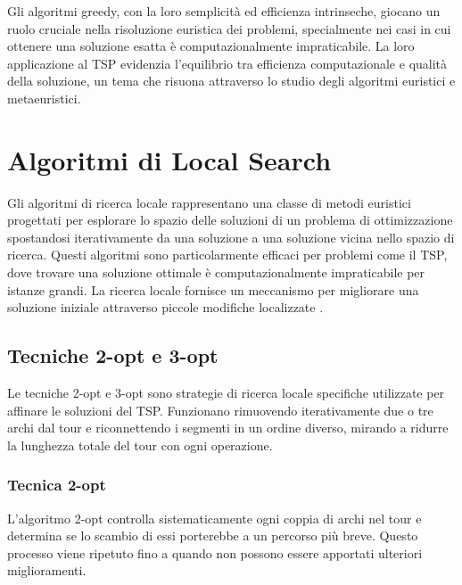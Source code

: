 Gli algoritmi greedy, con la loro semplicità ed efficienza intrinseche, giocano un ruolo cruciale nella risoluzione euristica dei problemi, specialmente nei casi in cui ottenere una soluzione esatta è computazionalmente impraticabile. La loro applicazione al \gls{TSP} evidenzia l'equilibrio tra efficienza computazionale e qualità della soluzione, un tema che risuona attraverso lo studio degli algoritmi euristici e metaeuristici.

\section{Algoritmi di Local Search}

Gli algoritmi di ricerca locale rappresentano una classe di metodi euristici progettati per esplorare lo spazio delle soluzioni di un problema di ottimizzazione spostandosi iterativamente da una soluzione a una soluzione vicina nello spazio di ricerca. Questi algoritmi sono particolarmente efficaci per problemi come il \gls{TSP}, dove trovare una soluzione ottimale è computazionalmente impraticabile per istanze grandi. La ricerca locale fornisce un meccanismo per migliorare una soluzione iniziale attraverso piccole modifiche localizzate \cite{Johnson2002,Lawler1985}.

\subsection{Tecniche 2-opt e 3-opt}

Le tecniche 2-opt e 3-opt sono strategie di ricerca locale specifiche utilizzate per affinare le soluzioni del \gls{TSP}. Funzionano rimuovendo iterativamente due o tre archi dal tour e riconnettendo i segmenti in un ordine diverso, mirando a ridurre la lunghezza totale del tour con ogni operazione.

\subsubsection{Tecnica 2-opt}

L'algoritmo 2-opt controlla sistematicamente ogni coppia di archi nel tour e determina se lo scambio di essi porterebbe a un percorso più breve. Questo processo viene ripetuto fino a quando non possono essere apportati ulteriori miglioramenti.


